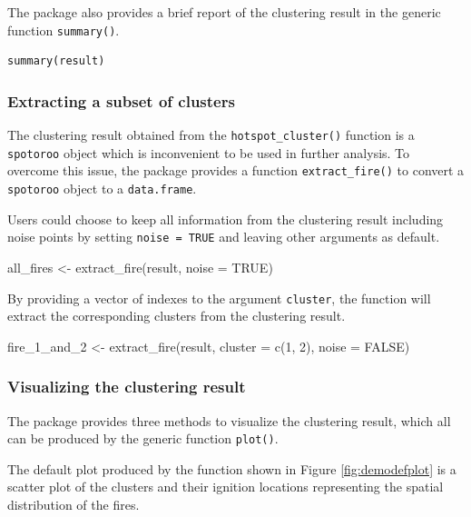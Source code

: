 The package also provides a brief report of the clustering result in the
generic function \texttt{summary()}.

\begin{verbatim}
summary(result)
\end{verbatim}

\hypertarget{extracting-a-subset-of-clusters}{%
\subsubsection{Extracting a subset of
clusters}\label{extracting-a-subset-of-clusters}}

The clustering result obtained from the \texttt{hotspot\_cluster()}
function is a \texttt{spotoroo} object which is inconvenient to be used
in further analysis. To overcome this issue, the package provides a
function \texttt{extract\_fire()} to convert a \texttt{spotoroo} object
to a \texttt{data.frame}.

Users could choose to keep all information from the clustering result
including noise points by setting \texttt{noise\ =\ TRUE} and leaving
other arguments as default.

\begin{Schunk}
\begin{Sinput}
all_fires <- extract_fire(result, noise = TRUE)
\end{Sinput}
\end{Schunk}

By providing a vector of indexes to the argument \texttt{cluster}, the
function will extract the corresponding clusters from the clustering
result.

\begin{Schunk}
\begin{Sinput}
fire_1_and_2 <- extract_fire(result, cluster = c(1, 2), noise = FALSE)
\end{Sinput}
\end{Schunk}

\hypertarget{visualizing-the-clustering-result}{%
\subsubsection{Visualizing the clustering
result}\label{visualizing-the-clustering-result}}

The package provides three methods to visualize the clustering result,
which all can be produced by the generic function \texttt{plot()}.

The default plot produced by the function shown in Figure
\ref{fig:demodefplot} is a scatter plot of the clusters and their
ignition locations representing the spatial distribution of the fires.

